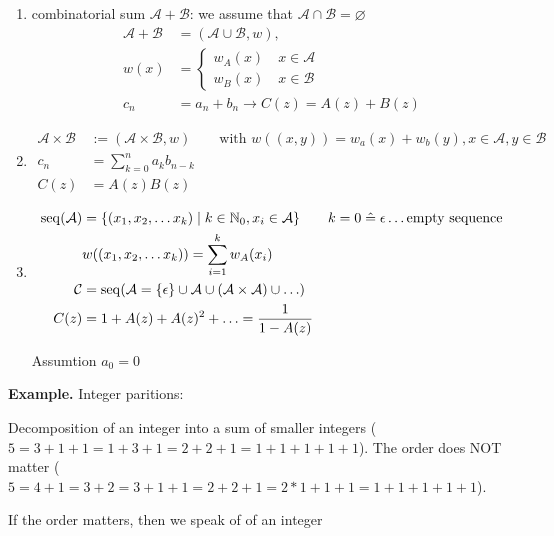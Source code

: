 \begin{enumerate}[1)]
\item combinatorial sum $\mathcal{A} + \mathcal{B}$:
    we assume that $\mathcal{A} \cap \mathcal{B} = \varnothing$
    \begin{align*}
        \mathcal{A} + \mathcal{B} &= (\mathcal{A} \cup \mathcal{B} , w), \\
        w(x) &= \begin{cases}
            {w_A(x) \quad x \in \mathcal{A}}\\
            {w_B(x) \quad x \in \mathcal{B}}
			\end{cases}\\
        c_n &= a_n + b_ n\rightarrow C(z) = A(z) + B(z)
    \end{align*}
\item 
    \begin{align*}
        \mathcal{A} \times \mathcal{B} 
        &:= (\mathcal{A} \times \mathcal{B}, w) 
        \qquad \text{with } w((x,y)) = w_a(x) + w_b(y), x\in \mathcal{A}, y\in \mathcal{B}\\
        c_n &= \sum_{k=0}^n a_kb_{n-k}\\
        C(z) &= A(z)B(z)
    \end{align*}

\item
    \begin{align*}
        \operatorname{seq}(\mathcal{A}) &= \{ (x_1, x_2, \ldots x_k) \mid k \in \mathbb{N}_0, x_i \in \mathcal{A}\}
        \qquad k = 0 \mathrel{\hat{=}} \epsilon \ldots \text{empty sequence}\\
        &w((x_1, x_2, \ldots x_k) ) = \sum_{i=1}^{k} w_A(x_i) \\
        \mathcal{C} &= \operatorname{seq}(\mathcal{A} = \{\epsilon\} \cup \mathcal{A} \cup (\mathcal{A}\times\mathcal{A}) \cup \ldots )\\
        C(z) &= 1 + A(z) + A(z)^2 + \ldots = \frac{1}{1-A(z)} \\
    \end{align*}
    
    Assumtion $a_0 = 0$
\end{enumerate}

\textbf{Example.}
Integer paritions:

Decomposition of an integer into a sum of smaller integers ($5 = 3+1+1= 1+3+1 = 2+2+1 = 1+1+1+1+1$). The order does NOT matter ($5= 4+1 = 3 + 2 = 3+1+1 = 2+2+1 = 2*1+1+1 = 1+1+1+1+1$). 

If the order matters, then we speak of  of an integer

